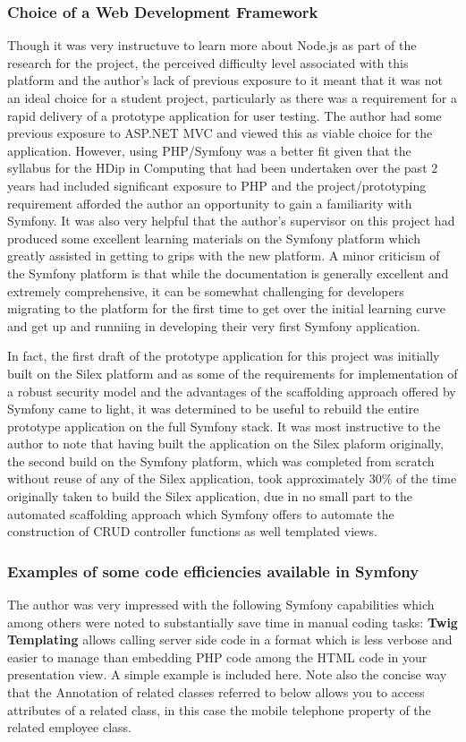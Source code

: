 \documentclass[a4paper,12pt]{article}
\begin{document}
\subsubsection{Choice of a Web Development Framework}

Though it was very instructuve to learn more about Node.js as part of the research for the project, the perceived difficulty level associated with this platform and the author's lack of previous exposure to it meant that it was not an ideal choice for a student project, particularly as there was a requirement for a rapid delivery of a prototype application for user testing. The author had some previous exposure to ASP.NET MVC and viewed this as viable choice for the application. However, using PHP/Symfony was a better fit given that the syllabus for the HDip in Computing that had been undertaken over the past 2 years had included significant exposure to PHP and the project/prototyping requirement afforded the author an opportunity to gain a familiarity with Symfony. It was also very helpful that the author's supervisor on this project had produced some excellent learning materials on the Symfony platform which greatly assisted in getting to grips with the new platform. A minor criticism of the Symfony platform is that while the documentation is generally excellent and extremely comprehensive, it can be somewhat challenging for developers migrating to the platform for the first time to get over the initial learning curve and get up and runniing in developing their very first Symfony application.

In fact, the first draft of the prototype application for this project was initially built on the Silex platform and as some of the requirements for implementation of a robust security model and the advantages of the scaffolding approach offered by Symfony came to light, it was determined to be useful to rebuild the entire prototype application on the full Symfony stack. It was most instructive to the author to note that having built the application on the Silex plaform originally, the second build on the Symfony platform, which was completed from scratch without reuse of any of the Silex application, took approximately 30\% of the time originally taken to build the Silex application, due in no small part to the automated scaffolding approach which Symfony offers to automate the construction of CRUD controller functions as well templated views. 
\subsubsection{Examples of some code efficiencies available in Symfony}
The author was very impressed with the following Symfony capabilities which among others were noted to substantially save time in manual coding tasks:
\textbf{Twig Templating }allows calling server side code in a format which is less verbose and easier to manage than embedding PHP code among the HTML code in your presentation view. A simple example is included here. Note also the concise way that the Annotation of related classes referred to below allows you to access attributes of a related class, in this case the mobile telephone property of the related employee class.
\end{document}
